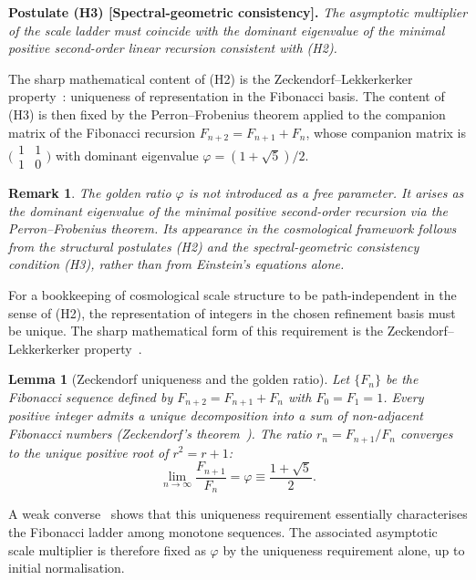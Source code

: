 \documentclass[12pt,a4paper]{article}
\newtheorem{lemma}[theorem]{Lemma}
\newtheorem{remark}{Remark}[section]
\begin{document}
\medskip
\noindent\textbf{Postulate (H3) [Spectral-geometric consistency].}
\textit{The asymptotic multiplier of the scale ladder must
coincide with the dominant eigenvalue of the minimal
positive second-order linear recursion consistent with
(H2).}

\medskip
The sharp mathematical content of (H2) is the
Zeckendorf--Lekkerkerker
property~\cite{Lekkerkerker1951,Keller1972}: uniqueness
of representation in the Fibonacci basis. The content of
(H3) is then fixed by the Perron--Frobenius theorem applied
to the companion matrix of the Fibonacci recursion
$F_{n+2} = F_{n+1} + F_n$, whose companion matrix is
$\bigl(\begin{smallmatrix}1&1\\1&0\end{smallmatrix}\bigr)$
with dominant eigenvalue $\varphi = (1+\sqrt{5})/2$.

\begin{remark}
The golden ratio $\varphi$ is \emph{not} introduced as a
free parameter. It arises as the dominant eigenvalue of
the minimal positive second-order recursion via the
Perron--Frobenius theorem. Its appearance in the
cosmological framework follows from the structural
postulates (H2) and the spectral-geometric consistency
condition (H3), rather than from Einstein's equations
alone.
\end{remark}

For a bookkeeping of cosmological scale structure to be
path-independent in the sense of (H2), the representation
of integers in the chosen refinement basis must be unique. The sharp
mathematical form of this requirement is the
Zeckendorf--Lekkerkerker
property~\cite{Lekkerkerker1951,Keller1972}.

\begin{lemma}[Zeckendorf uniqueness and the golden ratio]
\label{lem:zeckendorf}
Let $\{F_n\}$ be the Fibonacci sequence defined by
$F_{n+2} = F_{n+1} + F_n$ with $F_0 = F_1 = 1$. Every
positive integer admits a unique decomposition into a sum
of non-adjacent Fibonacci numbers
(Zeckendorf's theorem~\cite{Lekkerkerker1951,Keller1972}).
The ratio $r_n = F_{n+1}/F_n$ converges to the unique
positive root of $r^2 = r+1$:
\begin{equation}
  \lim_{n\to\infty}\frac{F_{n+1}}{F_n}
  = \varphi \equiv \frac{1+\sqrt{5}}{2}.
  \label{eq:phi}
\end{equation}
\end{lemma}

A weak converse~\cite{Chang2020} shows that this uniqueness
requirement essentially characterises the Fibonacci ladder
among monotone sequences. The associated asymptotic scale
multiplier is therefore fixed as $\varphi$ by the uniqueness
requirement alone, up to initial normalisation.
\end{document}
